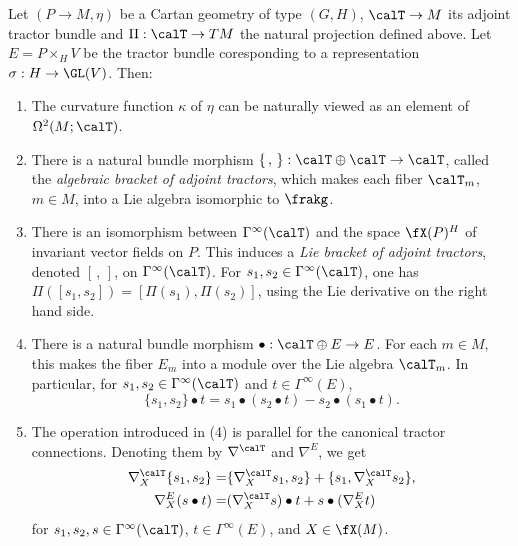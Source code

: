 \begin{prop}\label{prop 1.5.7 Cap}
    Let $(P\to M,\eta)$ be a Cartan geometry of type $(G,H)$, $\calT\to M$ its adjoint tractor bundle and $\Pi:\calT\to TM$ the natural projection defined above. Let $E=P\times_H V$ be the tractor bundle coresponding to a representation $\sigma:H\to\GL(V)$. Then:
    \begin{enumerate}[label=(\arabic*)]
        \item The curvature function $\kappa$ of $\eta$ can be naturally viewed as an element of $\Omega^2(M;\calT)$.
        \item There is a natural bundle morphism $\{\,,\,\}:\calT\oplus\calT\to \calT$, called the \emph{algebraic bracket of adjoint tractors}, which makes each fiber $\calT_m$, $m\in M$, into a Lie algebra isomorphic to $\frakg$.
        \item There is an isomorphism between $\Gamma^\infty(\calT)$ and the space $\fX(P)^H$ of invariant vector fields on $P$. This induces a \emph{Lie bracket of adjoint tractors}, denoted $[\,,\,]$, on $\Gamma^\infty(\calT)$. For $s_1,s_2\in\Gamma^\infty(\calT)$, one has $\Pi([s_1,s_2])=[\Pi(s_1),\Pi(s_2)]$, using the Lie derivative on the right hand side.
        \item There is a natural bundle morphism $\bullet:\calT\oplus E\to E$. For each $m\in M$, this makes the fiber $E_m$ into a module over the Lie algebra $\calT_m$. In particular, for $s_1,s_2\in\Gamma^\infty(\calT)$ and $t\in \Gamma^\infty(E)$, 
        \[\{s_1,s_2\}\bullet t=s_1\bullet(s_2\bullet t)-s_2\bullet(s_1\bullet t).\]
        \item The operation introduced in (4) is parallel for the canonical tractor connections. Denoting them by $\nabla^\calT$ and $\nabla^E$, we get 
        \begin{align}
            \nabla^\calT_X\{s_1,s_2\}=&\{\nabla^\calT_X s_1,s_2\}+\{s_1,\nabla^\calT_X s_2\},\\
            \nabla^E_X(s\bullet t)=&(\nabla^\calT_X s)\bullet t+s\bullet (\nabla^E_X t)
        \end{align}
        for $s_1,s_2,s\in\Gamma^\infty(\calT)$, $t\in\Gamma^\infty(E)$, and $X\in\fX(M)$.
    \end{enumerate}
\end{prop}

